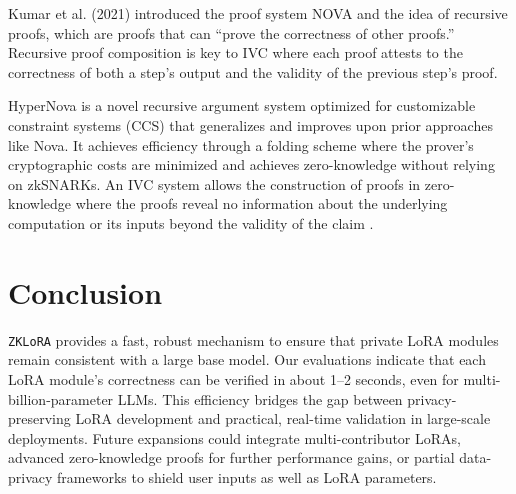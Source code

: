 \documentclass[11pt]{article}
\begin{document}
Kumar et al. (2021) \cite{kothapalli2022nova} introduced the proof system NOVA and the idea of recursive proofs, which are proofs that can ``prove the correctness of other proofs.'' Recursive proof composition is key to IVC where each proof attests to the correctness of both a step’s output and the validity of the previous step’s proof.

HyperNova \cite{kothapalli2024hypernova} is a novel recursive argument system optimized for customizable constraint systems (CCS) that generalizes and improves upon prior approaches like Nova. It achieves efficiency through a folding scheme where the prover’s cryptographic costs are minimized and achieves zero-knowledge without relying on zkSNARKs. An IVC system allows the construction of proofs in zero-knowledge where the proofs reveal no information about the underlying computation or its inputs beyond the validity of the claim \cite{valiant2008incrementally}.

\section{Conclusion}

\texttt{ZKLoRA} provides a fast, robust mechanism to ensure that private LoRA modules remain consistent with a large base model. Our evaluations indicate that each LoRA module’s correctness can be verified in about 1--2 seconds, even for multi-billion-parameter LLMs. This efficiency bridges the gap between privacy-preserving LoRA development and practical, real-time validation in large-scale deployments. Future expansions could integrate multi-contributor LoRAs, advanced zero-knowledge proofs for further performance gains, or partial data-privacy frameworks to shield user inputs as well as LoRA parameters.



\end{document}
